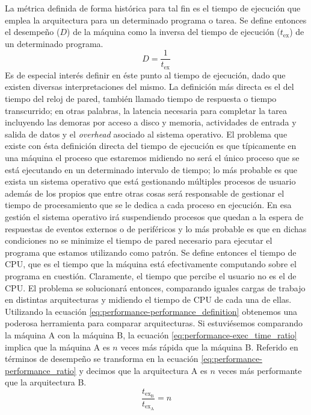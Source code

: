 La métrica definida de forma histórica para tal fin es el tiempo de ejecución 
que emplea la arquitectura para un determinado programa o tarea. Se define 
entonces el desempeño ($D$) de la máquina como la inversa del tiempo de 
ejecución ($t_{\text{ex}}$) de un determinado programa.
\begin{equation}
  \label{eq:performance-performance_definition}
  D = \dfrac{1}{t_\text{ex}}
\end{equation}
Es de especial interés definir en éste punto al tiempo de ejecución, dado que 
existen diversas interpretaciones del mismo. La definición más directa es el 
del tiempo del reloj de pared, también llamado tiempo de respuesta o tiempo 
transcurrido; en otras palabras, la latencia necesaria para completar la tarea 
incluyendo las demoras por acceso a disco y memoria, actividades de entrada y 
salida de datos y el \emph{overhead} asociado al sistema operativo. El 
problema que existe con ésta definición directa del tiempo de ejecución es que 
típicamente en una máquina el proceso que estaremos midiendo no será el único 
proceso que se está ejecutando en un determinado intervalo de tiempo; lo más 
probable es que exista un sistema operativo que está gestionando múltiples 
procesos de usuario además de los propios que entre otras cosas será 
responsable de gestionar el tiempo de procesamiento que se le dedica a cada 
proceso en ejecución. En esa gestión el sistema operativo irá suspendiendo 
procesos que quedan a la espera de respuestas de eventos externos o de 
periféricos y lo más probable es que en dichas condiciones no se minimize el 
tiempo de pared necesario para ejecutar el programa que estamos utilizando como 
patrón. Se define entonces el tiempo de CPU, que es el tiempo que la máquina 
está efectivamente computando sobre el programa en cuestión. Claramente, el 
tiempo que percibe el usuario no es el de CPU. El problema se solucionará 
entonces, comparando iguales cargas de trabajo en distintas arquitecturas y 
midiendo el tiempo de CPU de cada una de ellas. Utilizando la ecuación 
\ref{eq:performance-performance_definition} obtenemos una poderosa 
herramienta para comparar arquitecturas. Si estuviésemos comparando la 
máquina A con la máquina B, la ecuación \ref{eq:performance-exec_time_ratio} 
implica que la máquina A es $n$ veces más rápida que la máquina B. Referido en 
términos de desempeño se transforma en la ecuación 
\ref{eq:performance-performance_ratio} y decimos que la arquitectura A es $n$
veces más performante que la arquitectura B.
\begin{equation}
  \label{eq:performance-exec_time_ratio}
  \dfrac{ t_{\text{ex}_{\text{B}}} } { t_{\text{ex}_{\text{A}}} } = n
\end{equation}
